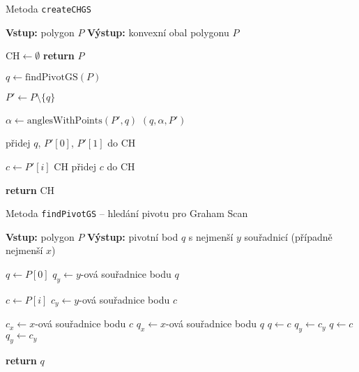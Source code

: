 \begin{algorithm}
    \caption{Metoda \texttt{createCHGS}}
    \begin{algorithmic}[1]
        \STATE \textbf{Vstup:} polygon $P$
        \STATE \textbf{Výstup:} konvexní obal polygonu $P$

        \STATE $\text{CH} \gets \emptyset$
            \STATE \textbf{return} $P$
        \ENDIF

        \STATE $q \gets \text{findPivotGS}(P)$ 

        \STATE $P' \gets P \setminus \{q\}$ 

        \STATE $\alpha \gets \text{anglesWithPoints}(P', q)$ 
        \STATE {}$(q, \alpha, P')$ 

        \STATE přidej $q$, $P'[0]$, $P'[1]$ do $\text{CH}$

            \STATE $c \gets P'[i]$
                \STATE {} $\text{CH}$
            \ENDWHILE
            \STATE přidej $c$ do $\text{CH}$
        \ENDFOR

        \STATE \textbf{return} $\text{CH}$
    \end{algorithmic}
\end{algorithm}

\begin{algorithm}
    \caption{Metoda \texttt{findPivotGS} -- hledání pivotu pro Graham Scan}
    \begin{algorithmic}[1]
        \STATE \textbf{Vstup:} polygon $P$
        \STATE \textbf{Výstup:} pivotní bod $q$ s nejmenší $y$ souřadnicí (případně nejmenší $x$)

        \STATE $q \gets P[0]$
        \STATE $q_y \gets y$-ová souřadnice bodu $q$

            \STATE $c \gets P[i]$
            \STATE $c_y \gets y$-ová souřadnice bodu $c$

                    \STATE $c_x \gets x$-ová souřadnice bodu $c$
                    \STATE $q_x \gets x$-ová souřadnice bodu $q$
                        \STATE $q \gets c$
                        \STATE $q_y \gets c_y$
                    \ENDIF
                \ELSE
                    \STATE $q \gets c$
                    \STATE $q_y \gets c_y$
                \ENDIF
            \ENDIF
        \ENDFOR

        \STATE \textbf{return} $q$
    \end{algorithmic}
\end{algorithm}

